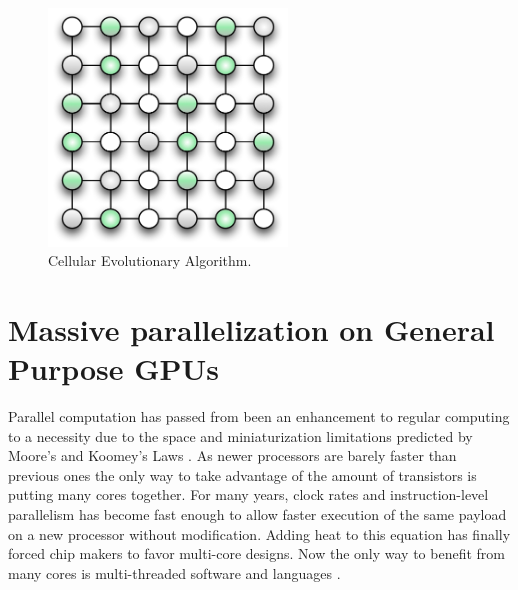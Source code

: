 \documentclass{article}
\begin{document}
\begin{description}
\begin{figure}[tb]
\centering
\includegraphics[width=15pc]{cellular}
\caption{Cellular Evolutionary Algorithm.}
\label{fig:cellular}
\end{figure}

\end{description}






\section{Massive parallelization on General Purpose GPUs}
\label{sec:parall_and_GPUs}

Parallel computation has passed from been an enhancement to regular computing to a
necessity due to the space and miniaturization limitations predicted by Moore's and Koomey's Laws \cite{10.1109/MAHC.2010.28}. 
As newer processors are barely faster than previous ones
the only way to take advantage of the amount of transistors is putting
many cores together. For many years, clock rates and instruction-level
parallelism has become fast enough to allow faster execution of the
same payload on a new processor without modification. Adding heat to
this equation has finally forced chip makers to favor multi-core
designs. Now the only way to benefit from many cores is multi-threaded
software \cite{6307773} and languages
\cite{DBLP:conf/evoW/GuervosLCVG19}. 
\end{document}
